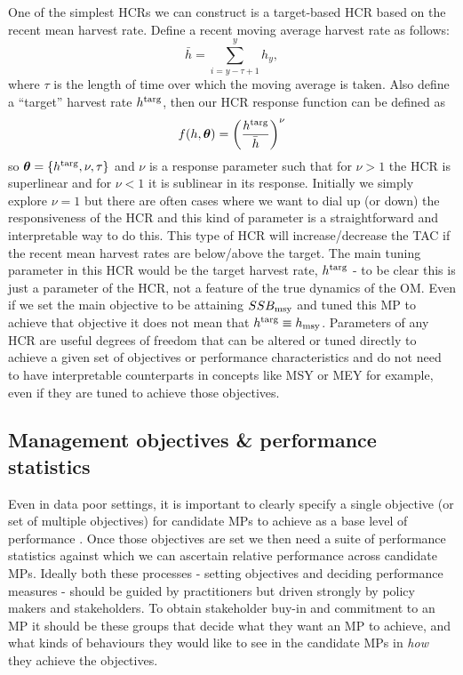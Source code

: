 \documentclass[12pt,a4paper,twoside,times,sky,standard]{csiroreport2017}
\newcommand{\ds}{\displaystyle}
\newcommand{\xtheta}{\mbox{\boldmath$\theta$}}
\begin{document}
One of the simplest HCRs we can construct is a target-based HCR based on the recent mean harvest rate. Define a recent moving average harvest rate as follows:
\begin{equation*}
    \ds \bar{h}=\sum\limits_{i=y-\tau+1}^y h_y,
\end{equation*}
where $\tau$ is the length of time over which the moving average is taken. Also define a ``target'' harvest rate $h^{\rm targ}$, then our HCR response function can be defined as
\begin{equation*}
    \ds f(h,\xtheta)=\left(\frac{h^{\rm targ}}{\bar{h}}\right)^\nu
\end{equation*}
so $\xtheta=\{h^{\rm targ},\nu,\tau\}$ and $\nu$ is a response parameter such that for $\nu>1$ the HCR is superlinear and for $\nu<1$ it is sublinear in its response. Initially we simply explore $\nu=1$ but there are often cases where we want to dial up (or down) the responsiveness of the HCR and this kind of parameter is a straightforward and interpretable way to do this. This type of HCR will increase/decrease the TAC if the recent mean harvest rates are below/above the target. The main tuning parameter in this HCR would be the target harvest rate, $h^{\rm targ}$ - to be clear this is just a parameter of the HCR, not a feature of the true dynamics of the OM. Even if we set the main objective to be attaining $SSB_{\rm msy}$ and tuned this MP to achieve that objective it does not mean that $h^{\rm targ}\equiv h_{\rm msy}$. Parameters of any HCR are useful degrees of freedom that can be altered or tuned directly to achieve a given set of objectives or performance characteristics and do not need to have interpretable counterparts in concepts like MSY or MEY for example, even if they are tuned to achieve those objectives. 

\subsection{Management objectives \& performance statistics}

Even in data poor settings, it is important to clearly specify a single objective (or set of multiple objectives) for candidate MPs to achieve as a base level of performance \cite{mse}. Once those objectives are set we then need a suite of performance statistics against which we can ascertain relative performance across candidate MPs. Ideally both these processes - setting objectives and deciding performance measures - should be guided by practitioners but driven strongly by policy makers and stakeholders. To obtain stakeholder buy-in and commitment to an MP it should be these groups that decide what they want an MP to achieve, and what kinds of behaviours they would like to see in the candidate MPs in \emph{how} they achieve the objectives. 
\end{document}
